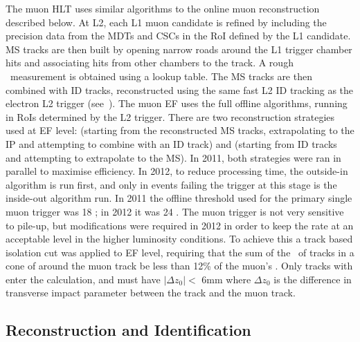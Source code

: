 The muon HLT uses similar algorithms to the online muon reconstruction described
below. At L2, each L1 muon candidate is refined by including the precision
data from the MDTs and CSCs in the RoI defined by the L1 candidate. MS tracks
are then built by opening narrow roads around the L1 trigger chamber hits and
associating hits from other chambers to the track. A rough \pt\ measurement is
obtained using a lookup table. The MS tracks are then combined with ID tracks,
reconstructed using the same fast L2 ID tracking as the electron L2 trigger
(see~). The muon EF uses the full offline algorithms,
running in RoIs determined by the L2 trigger. There are two reconstruction
strategies used at EF level:
 (starting from the reconstructed MS tracks, extrapolating to
the IP and attempting to combine with an ID track) and 
(starting from ID tracks and attempting to extrapolate to the MS). In 2011, both
strategies were ran in parallel to maximise efficiency. In 2012, to reduce
processing time, the outside-in algorithm is run first, and only in events failing
the trigger at this stage is the inside-out algorithm run. In 2011 the offline
threshold used for the primary single muon trigger was 18 \GeV; in 2012 it was 24 \GeV. The muon trigger is
not very sensitive to pile-up, but modifications were required in 2012 in order
to keep the rate at an acceptable level in the higher luminosity conditions. To
achieve this a track based isolation cut was applied to EF level, requiring that
the sum of the \pt\ of tracks in a cone of  around the muon track
be less than 12\% of the muon's \pt. Only tracks with  enter the
calculation, and must have  $|\Delta z_{0}| <$ 6mm where $\Delta z_{0}$ is the
difference in transverse impact parameter between the track and the muon track.

\subsection{Reconstruction and Identification}
\label{sec:reco-el-reco}
